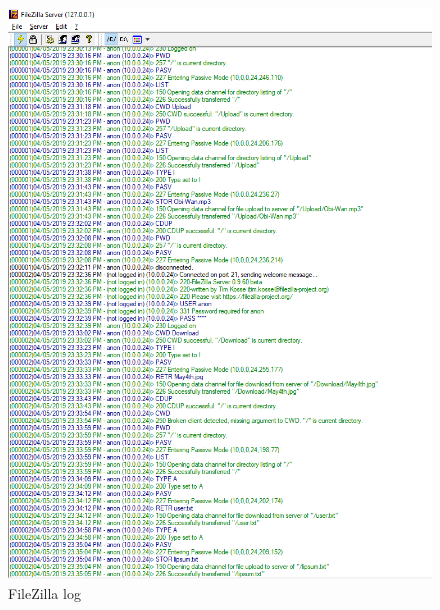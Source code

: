 \documentclass[10pt, conference]{IEEEtran}
\begin{document}
\begin{appendices}
\begin{figure}[h!]
\renewcommand{\thefigure}{\arabic{figure}}
\centering
\includegraphics[scale=0.9]{FileZilla.png}
\caption{FileZilla log}
\label{fig: FileZilla log}
\end{figure}


\end{appendices}
\end{document}
